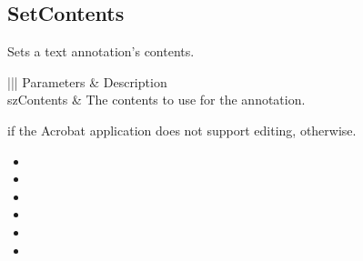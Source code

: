 \documentclass[letterpaper,12pt,english,openany,oneside]{sphinxmanual}
\begin{document}
\subsection{SetContents}
\label{\detokenize{IAC_API_OLE_Objects:setcontents}}
Sets a text annotation’s contents.


\begin{sphinxVerbatim}[commandchars=\\\{\}]
  
\end{sphinxVerbatim}
\label{\detokenize{IAC_API_OLE_Objects:parameters-42}}


\begin{savenotes}\sphinxattablestart
\centering
{}\label{\detokenize{IAC_API_OLE_Objects:section-47}}\nobreak
\begin{tabular}[t]{|||}
\hline
\sphinxstyletheadfamily 
Parameters
&\sphinxstyletheadfamily 
Description
\\
\hline
szContents
&
The contents to use for the annotation.
\\
\hline
\end{tabular}
\par
\sphinxattableend\end{savenotes}


 if the Acrobat application does not support editing,  otherwise.

\label{\detokenize{IAC_API_OLE_Objects:related-methods-77}}
\begin{itemize}
\item {} 
 

\item {} 
 

\item {} 
 

\item {} 
 

\item {} 
 

\item {} 
 

\end{itemize}
\end{document}
